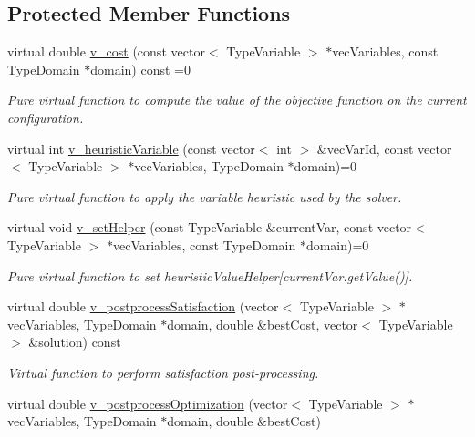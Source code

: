 \subsection*{Protected Member Functions}
\begin{DoxyCompactItemize}
\item 
virtual double \hyperlink{classghost_1_1Objective_affb6d6730adfbfe6a1f990e00d2a5eb2}{v\-\_\-cost} (const vector$<$ Type\-Variable $>$ $\ast$vec\-Variables, const Type\-Domain $\ast$domain) const =0
\begin{DoxyCompactList}\small\item\em Pure virtual function to compute the value of the objective function on the current configuration. \end{DoxyCompactList}\item 
virtual int \hyperlink{classghost_1_1Objective_ae4a49d23569c367182f934c25a6c6103}{v\-\_\-heuristic\-Variable} (const vector$<$ int $>$ \&vec\-Var\-Id, const vector$<$ Type\-Variable $>$ $\ast$vec\-Variables, Type\-Domain $\ast$domain)=0
\begin{DoxyCompactList}\small\item\em Pure virtual function to apply the variable heuristic used by the solver. \end{DoxyCompactList}\item 
virtual void \hyperlink{classghost_1_1Objective_a8c4efc1602123b28626a37c53e100a6e}{v\-\_\-set\-Helper} (const Type\-Variable \&current\-Var, const vector$<$ Type\-Variable $>$ $\ast$vec\-Variables, const Type\-Domain $\ast$domain)=0
\begin{DoxyCompactList}\small\item\em Pure virtual function to set heuristic\-Value\-Helper\mbox{[}current\-Var.\-get\-Value()\mbox{]}. \end{DoxyCompactList}\item 
virtual double \hyperlink{classghost_1_1Objective_a403fdae56c632409f244f4ffe79dd2df}{v\-\_\-postprocess\-Satisfaction} (vector$<$ Type\-Variable $>$ $\ast$vec\-Variables, Type\-Domain $\ast$domain, double \&best\-Cost, vector$<$ Type\-Variable $>$ \&solution) const 
\begin{DoxyCompactList}\small\item\em Virtual function to perform satisfaction post-\/processing. \end{DoxyCompactList}\item 
virtual double \hyperlink{classghost_1_1Objective_a25c90555bec03d1d15f83ae145d81f8f}{v\-\_\-postprocess\-Optimization} (vector$<$ Type\-Variable $>$ $\ast$vec\-Variables, Type\-Domain $\ast$domain, double \&best\-Cost)

\end{DoxyCompactItemize}
